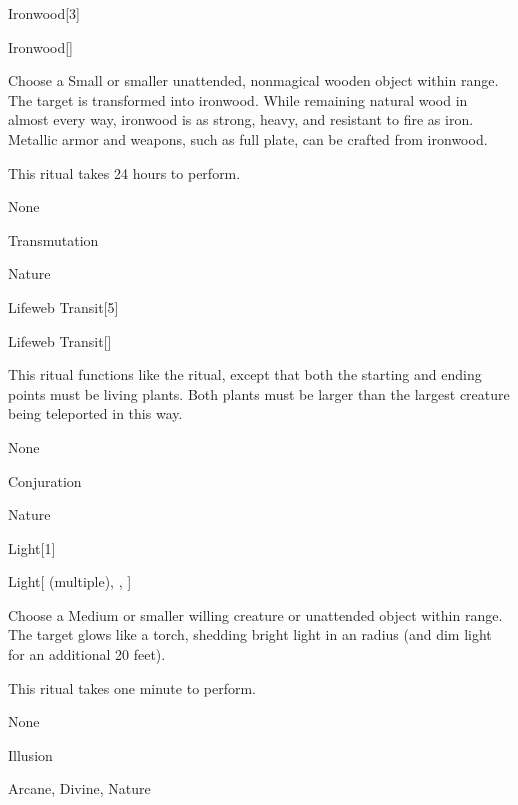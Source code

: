 \begin{spellsection}{Ironwood}[3]


\begin{ability}{Ironwood}[]

Choose a Small or smaller unattended, nonmagical wooden object within \rngclose range.
The target is transformed into ironwood.
While remaining natural wood in almost every way, ironwood is as strong, heavy, and resistant to fire as iron.
Metallic armor and weapons, such as full plate, can be crafted from ironwood.

This ritual takes 24 hours to perform.

\end{ability}


 None

 Transmutation

 Nature
\end{spellsection}


\begin{spellsection}{Lifeweb Transit}[5]


\begin{ability}{Lifeweb Transit}[]

This ritual functions like the  ritual, except that both the starting and ending points must be living plants.
Both plants must be larger than the largest creature being teleported in this way.

\end{ability}


 None

 Conjuration

 Nature
\end{spellsection}


\begin{spellsection}{Light}[1]


\begin{ability}{Light}[ (multiple), , ]

Choose a Medium or smaller willing creature or unattended object within \rngclose range.
The target glows like a torch, shedding bright light in an \areamed radius (and dim light for an additional 20 feet).

This ritual takes one minute to perform.

\end{ability}


 None

 Illusion

 Arcane, Divine, Nature
\end{spellsection}


